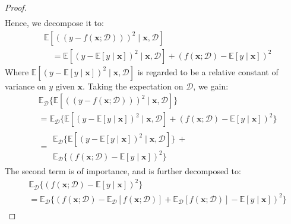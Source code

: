\documentclass[
  journal=largetwo,
  year=2025,
  volume=37,
]{cup-journal}
\begin{document}
\begin{proof}
\begin{equation}
\begin{split}
        \end{split}
    \end{equation}
    Hence, we decompose it to: 
    \begin{equation}
        \begin{split}
            &\mathbb{E} \left[((y-f(\mathbf{x};\mathcal{D})))^{2}\mid \mathbf{x}, \mathcal{D}\right] \\
            & \quad = \mathbb{E}\left[(y-\mathbb{E}[y\mid \mathbf{x}])^{2}\mid \mathbf{x},\mathcal{D}\right] + (f(\mathbf{x};\mathcal{D})-\mathbb{E}[y\mid \mathbf{x}])^{2}
        \end{split}
    \end{equation}
    Where $\mathbb{E}\left[(y-\mathbb{E}[y\mid \mathbf{x}])^{2}\mid \mathbf{x},\mathcal{D}\right]$ is regarded to be a relative constant of variance on $y$ given $\mathbf{x}$. Taking the expectation on $\mathcal{D}$, we gain: 
    \begin{equation}
        \begin{split}
            &\mathbb{E}_{\mathcal{D}} \Big\{ \mathbb{E} \left[((y-f(\mathbf{x};\mathcal{D})))^{2}\mid \mathbf{x}, \mathcal{D}\right]\Big\} \\
            & = \mathbb{E}_{\mathcal{D}} \Big\{\mathbb{E}\left[(y-\mathbb{E}[y\mid \mathbf{x}])^{2}\mid \mathbf{x},\mathcal{D}\right] + (f(\mathbf{x};\mathcal{D})-\mathbb{E}[y\mid \mathbf{x}])^{2}\Big\}\\
            & = \begin{multlined}
                \mathbb{E}_{\mathcal{D}} \Big\{ \mathbb{E}\left[(y-\mathbb{E}[y\mid \mathbf{x}])^{2}\mid \mathbf{x},\mathcal{D}\right]\Big\} \: + \\ \mathbb{E}_{\mathcal{D}} \Big\{ (f(\mathbf{x};\mathcal{D})-\mathbb{E}[y\mid \mathbf{x}])^{2}\Big\}
            \end{multlined}
        \end{split}
    \end{equation}
    The second term is of importance, and is further decomposed to: 
    \begin{equation}
        \begin{split}
            & \mathbb{E}_{\mathcal{D}} \Big\{ (f(\mathbf{x};\mathcal{D})-\mathbb{E}[y\mid \mathbf{x}])^{2}\Big\} \\ 
            & = \mathbb{E}_{\mathcal{D}} \Big\{ (f(\mathbf{x};\mathcal{D})- \mathbb{E}_{\mathcal{D}}[f(\mathbf{x};\mathcal{D})] + \mathbb{E}_{\mathcal{D}}[f(\mathbf{x};\mathcal{D})] -\mathbb{E}[y\mid \mathbf{x}])^{2}\Big\} \\

\end{split}
\end{equation}
\end{proof}
\end{document}
